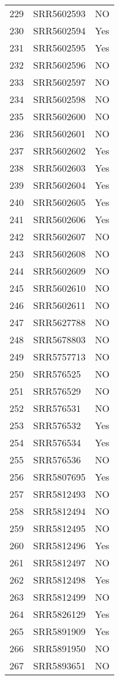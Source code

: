 \begin{table}[ht]
\begin{tabular}{rll}
  229 & SRR5602593 & NO \\ 
  230 & SRR5602594 & Yes \\ 
  231 & SRR5602595 & Yes \\ 
  232 & SRR5602596 & NO \\ 
  233 & SRR5602597 & NO \\ 
  234 & SRR5602598 & NO \\ 
  235 & SRR5602600 & NO \\ 
  236 & SRR5602601 & NO \\ 
  237 & SRR5602602 & Yes \\ 
  238 & SRR5602603 & Yes \\ 
  239 & SRR5602604 & Yes \\ 
  240 & SRR5602605 & Yes \\ 
  241 & SRR5602606 & Yes \\ 
  242 & SRR5602607 & NO \\ 
  243 & SRR5602608 & NO \\ 
  244 & SRR5602609 & NO \\ 
  245 & SRR5602610 & NO \\ 
  246 & SRR5602611 & NO \\ 
  247 & SRR5627788 & NO \\ 
  248 & SRR5678803 & NO \\ 
  249 & SRR5757713 & NO \\ 
  250 & SRR576525 & NO \\ 
  251 & SRR576529 & NO \\ 
  252 & SRR576531 & NO \\ 
  253 & SRR576532 & Yes \\ 
  254 & SRR576534 & Yes \\ 
  255 & SRR576536 & NO \\ 
  256 & SRR5807695 & Yes \\ 
  257 & SRR5812493 & NO \\ 
  258 & SRR5812494 & NO \\ 
  259 & SRR5812495 & NO \\ 
  260 & SRR5812496 & Yes \\ 
  261 & SRR5812497 & NO \\ 
  262 & SRR5812498 & Yes \\ 
  263 & SRR5812499 & NO \\ 
  264 & SRR5826129 & Yes \\ 
  265 & SRR5891909 & Yes \\ 
  266 & SRR5891950 & NO \\ 
  267 & SRR5893651 & NO \\ 

\end{tabular}
\end{table}
